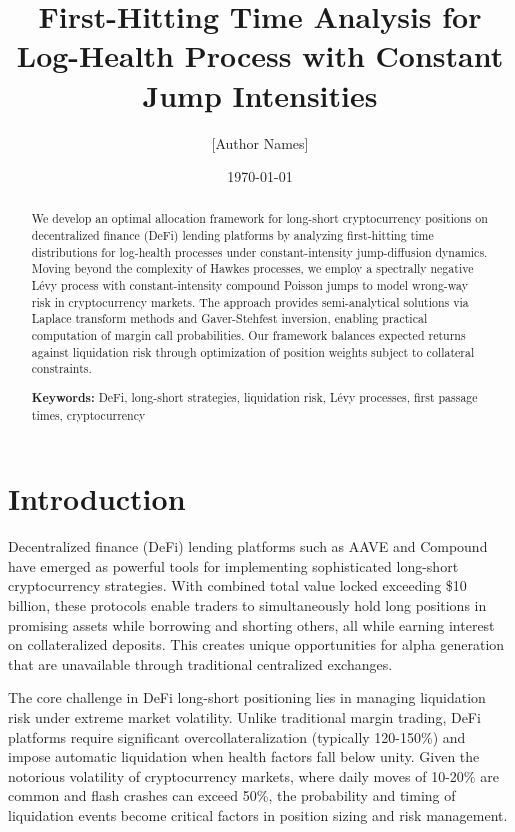 \documentclass{article}
\title{First-Hitting Time Analysis for Log-Health Process with Constant Jump Intensities}
\author{[Author Names]}
\date{\today}
\theoremstyle{definition}
\begin{document}
\maketitle

\begin{abstract}
We develop an optimal allocation framework for long-short cryptocurrency positions on decentralized finance (DeFi) lending platforms by analyzing first-hitting time distributions for log-health processes under constant-intensity jump-diffusion dynamics. Moving beyond the complexity of Hawkes processes, we employ a spectrally negative Lévy process with constant-intensity compound Poisson jumps to model wrong-way risk in cryptocurrency markets. The approach provides semi-analytical solutions via Laplace transform methods and Gaver-Stehfest inversion, enabling practical computation of margin call probabilities. Our framework balances expected returns against liquidation risk through optimization of position weights subject to collateral constraints.

\textbf{Keywords:} DeFi, long-short strategies, liquidation risk, Lévy processes, first passage times, cryptocurrency
\end{abstract}

\section{Introduction}

Decentralized finance (DeFi) lending platforms such as AAVE and Compound have emerged as powerful tools for implementing sophisticated long-short cryptocurrency strategies. With combined total value locked exceeding \$10 billion, these protocols enable traders to simultaneously hold long positions in promising assets while borrowing and shorting others, all while earning interest on collateralized deposits. This creates unique opportunities for alpha generation that are unavailable through traditional centralized exchanges.

The core challenge in DeFi long-short positioning lies in managing liquidation risk under extreme market volatility. Unlike traditional margin trading, DeFi platforms require significant overcollateralization (typically 120-150\%) and impose automatic liquidation when health factors fall below unity. Given the notorious volatility of cryptocurrency markets, where daily moves of 10-20\% are common and flash crashes can exceed 50\%, the probability and timing of liquidation events become critical factors in position sizing and risk management.
\end{document}
